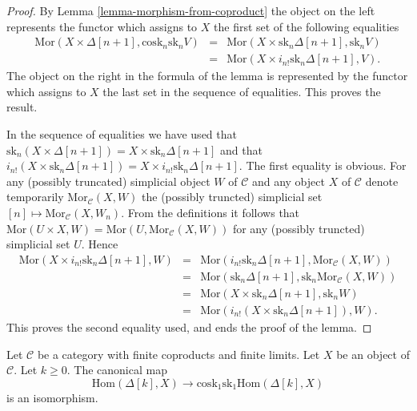 \begin{proof}
By Lemma \ref{lemma-morphism-from-coproduct}
the object on the left represents the functor
which assigns to $X$ the first set of the following
equalities
\begin{eqnarray*}
\text{Mor}(X \times \Delta[n + 1], \text{cosk}_n \text{sk}_n V)
& = &
\text{Mor}(X \times \text{sk}_n \Delta[n + 1], \text{sk}_n V) \\
& = &
\text{Mor}(X \times i_{n !} \text{sk}_n \Delta[n + 1], V).
\end{eqnarray*}
The object on the right in the formula of the lemma
is represented by the functor which assigns to $X$
the last set in the sequence of equalities.
This proves the result.

\medskip\noindent
In the sequence of equalities we have used that
$\text{sk}_n (X \times \Delta[n + 1]) = X \times \text{sk}_n \Delta[n + 1]$
and that
$i_{n!}(X \times \text{sk}_n \Delta[n + 1]) =
X \times i_{n !} \text{sk}_n \Delta[n + 1]$.
The first equality is obvious. For any (possibly truncated)
simplicial object $W$
of $\mathcal{C}$ and any object $X$ of $\mathcal{C}$
denote temporarily $\text{Mor}_\mathcal{C}(X, W)$ the
(possibly truncted) simplicial set
$[n] \mapsto \text{Mor}_\mathcal{C}(X, W_n)$. From the definitions
it follows that $\text{Mor}(U \times X, W) =
\text{Mor}(U, \text{Mor}_\mathcal{C}(X, W))$ for any
(possibly truncted) simplicial set $U$. Hence
\begin{eqnarray*}
\text{Mor}(X \times i_{n !} \text{sk}_n \Delta[n + 1], W)
& = &
\text{Mor}(i_{n !} \text{sk}_n \Delta[n + 1], \text{Mor}_\mathcal{C}(X, W)) \\
& = &
\text{Mor}(\text{sk}_n \Delta[n + 1],
\text{sk}_n\text{Mor}_\mathcal{C}(X, W)) \\
& = &
\text{Mor}(X \times \text{sk}_n \Delta[n + 1], \text{sk}_nW) \\
& = &
\text{Mor}(i_{n!}(X \times \text{sk}_n \Delta[n + 1]), W).
\end{eqnarray*}
This proves the second equality used, and ends the proof of the lemma.
\end{proof}

\begin{lemma}
\label{lemma-cosk-hom-deltak}
Let $\mathcal{C}$ be a category with finite coproducts
and finite limits. Let $X$ be an object of $\mathcal{C}$.
Let $k \geq 0$. The canonical map
$$
\text{Hom}(\Delta[k], X)
\longrightarrow
\text{cosk}_1 \text{sk}_1 \text{Hom}(\Delta[k], X)
$$
is an isomorphism.
\end{lemma}

